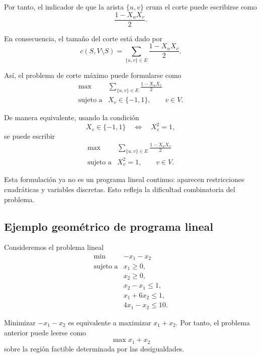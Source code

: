 Por tanto, el indicador de que la arista \(\{u,v\}\) cruza el corte puede escribirse como
\[
    \frac{1-X_uX_v}{2}.
\]

En consecuencia, el tamaño del corte está dado por
\[
    c(S,V\setminus S)
    =
    \sum_{\{u,v\}\in E}
    \frac{1-X_uX_v}{2}.
\]

Así, el problema de corte máximo puede formularse como
\[
    \begin{array}{ll}
        \max & \displaystyle
        \sum_{\{u,v\}\in E}
        \frac{1-X_uX_v}{2}
        \\[4mm]
        \text{sujeto a} & X_v\in\{-1,1\},
        \qquad v\in V.
    \end{array}
\]

De manera equivalente, usando la condición
\[
    X_v\in\{-1,1\}
    \quad \Longleftrightarrow \quad
    X_v^2=1,
\]
se puede escribir
\[
    \begin{array}{ll}
        \max & \displaystyle
        \sum_{\{u,v\}\in E}
        \frac{1-X_uX_v}{2}
        \\[4mm]
        \text{sujeto a} & X_v^2=1,
        \qquad v\in V.
    \end{array}
\]

\begin{remark}
Esta formulación ya no es un programa lineal continuo: aparecen restricciones cuadráticas y variables discretas. Esto refleja la dificultad combinatoria del problema.
\end{remark}

\subsection{Ejemplo geométrico de programa lineal}

Consideremos el problema lineal
\[
    \begin{array}{ll}
        \min & -x_1-x_2 \\[1mm]
        \text{sujeto a} & x_1\geq 0,\\
        & x_2\geq 0,\\
        & x_2-x_1\leq 1,\\
        & x_1+6x_2\leq 1,\\
        & 4x_1-x_2\leq 10.
    \end{array}
\]

Minimizar \(-x_1-x_2\) es equivalente a maximizar \(x_1+x_2\). Por tanto, el problema anterior puede leerse como
\[
    \max x_1+x_2
\]
sobre la región factible determinada por las desigualdades.

